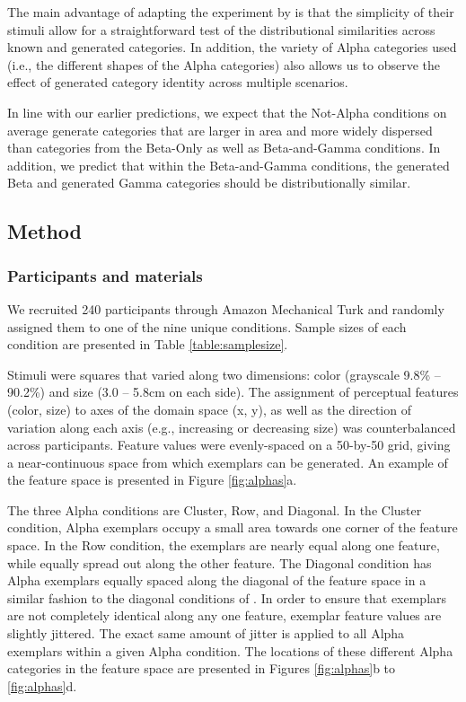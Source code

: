 \documentclass[10pt,letterpaper]{article}
\begin{document}
The main advantage of adapting the experiment by \cite{conaway2017packer} is that the simplicity of their stimuli allow for a straightforward test of the distributional similarities across known and generated categories. In addition, the variety of Alpha categories used (i.e., the different shapes of the Alpha categories) also allows us to observe the effect of generated category identity across multiple scenarios. 

In line with our earlier predictions, we expect that the Not-Alpha conditions on average generate categories that are larger in area and more widely dispersed than categories from the Beta-Only as well as Beta-and-Gamma conditions. In addition, we predict that within the Beta-and-Gamma conditions, the generated Beta and generated Gamma categories should be distributionally similar. 


\subsection{Method}

\subsubsection{Participants and materials}

We recruited 240 participants through Amazon Mechanical Turk and randomly
assigned them to one of the nine unique conditions. Sample sizes of each
condition are presented in Table \ref{table:samplesize}.

Stimuli were squares that varied along two dimensions: color (grayscale
9.8\% -- 90.2\%) and size (3.0 -- 5.8cm on each side). The assignment of perceptual
features (color, size) to axes of the domain space (x, y), as well as the
direction of variation along each axis (e.g., increasing or decreasing size) was
counterbalanced across participants. Feature values were evenly-spaced on a
50-by-50 grid, giving a near-continuous space from which exemplars can be generated. An example of the feature space is presented in Figure \ref{fig:alphas}a. 

The three Alpha conditions are Cluster, Row, and Diagonal. In the Cluster condition, Alpha exemplars occupy a small area towards one corner of the feature space. In the Row condition, the exemplars are nearly equal along one feature, while equally spread out along the other feature. The Diagonal condition has Alpha exemplars equally spaced along the diagonal of the feature space in a similar fashion to the diagonal conditions of \cite{jern2013probabilistic}. In order to ensure that exemplars are not completely identical along any one feature, exemplar feature values are slightly jittered. The exact same amount of jitter is applied to all Alpha exemplars within a given Alpha condition. The locations of these different Alpha categories in the feature space are presented in Figures \ref{fig:alphas}b to \ref{fig:alphas}d.
\end{document}
